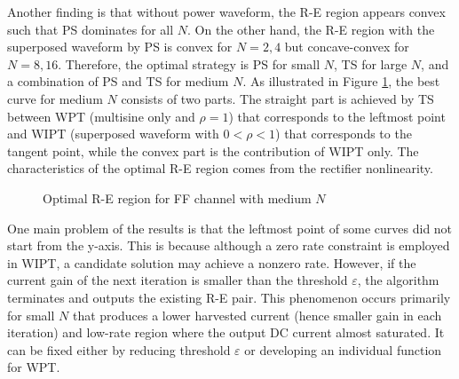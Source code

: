 Another finding is that without power waveform, the R-E region appears convex such that PS dominates for all $N$. On the other hand, the R-E region with the superposed waveform by PS is convex for $N = 2,4$ but concave-convex for $N = 8,16$. Therefore, the optimal strategy is PS for small $N$, TS for large $N$, and a combination of PS and TS for medium $N$. As illustrated in Figure \ref{fig:siso-subband-optimal}, the best curve for medium $N$ consists of two parts. The straight part is achieved by TS between WPT (multisine only and $\rho  = 1$) that corresponds to the leftmost point and WIPT (superposed waveform with $0 < \rho  < 1$) that corresponds to the tangent point, while the convex part is the contribution of WIPT only. The characteristics of the optimal R-E region comes from the rectifier nonlinearity.

\begin{figure}[ht]
  \centering
  \caption{Optimal R-E region for FF channel with medium $N$}\label{fig:siso-subband-optimal}
\end{figure}

One main problem of the results is that the leftmost point of some curves did not start from the y-axis. This is because although a zero rate constraint is employed in WIPT, a candidate solution may achieve a nonzero rate. However, if the current gain of the next iteration is smaller than the threshold $\varepsilon$, the algorithm terminates and outputs the existing R-E pair. This phenomenon occurs primarily for small $N$ that produces a lower harvested current (hence smaller gain in each iteration) and low-rate region where the output DC current almost saturated. It can be fixed either by reducing threshold $\varepsilon$ or developing an individual function for WPT.

